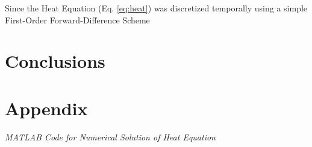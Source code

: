 \documentclass[10pt, letter, showtrims]{extarticle}
\begin{document}
		\noindent
		Since the Heat Equation (Eq. \ref{eq:heat}) was discretized temporally using a simple First-Order Forward-Difference Scheme		
		
		\pagebreak
		
		\section{Conclusions}
		
		\pagebreak	
	
	\section{Appendix}
	
	\centerline{\textit{MATLAB Code for Numerical Solution of Heat Equation}}
	
	
	
	\pagebreak
	
	
	
\end{document}
